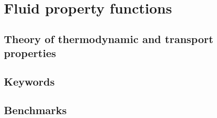 \chapter{Fluid property functions}
\label{chap-FP}
\section{Theory of thermodynamic and transport properties}




\section{Keywords}



\section{Benchmarks}



